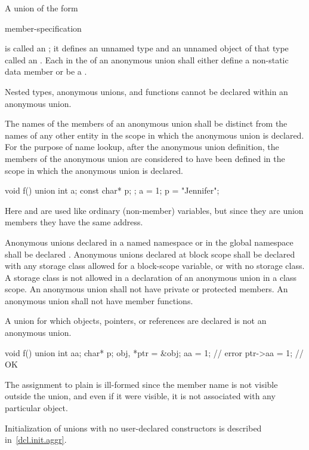 \pnum
A union of the form
\begin{ncsimplebnf}
 \terminal{\{} member-specification \terminal{\}} \terminal{;}
\end{ncsimplebnf}
is called an ; it defines an unnamed type and
an unnamed object of that type called an .
Each  in the 
of an anonymous union shall either define a non-static data member or be a
.
\begin{note}
Nested types, anonymous unions, and functions cannot be declared within an anonymous
union.
\end{note}
The names of the members of an anonymous union shall be distinct from
the names of any other entity in the scope in which the anonymous union
is declared. For the purpose of name lookup, after the anonymous union
definition, the members of the anonymous union are considered to have
been defined in the scope in which the anonymous union is declared.
%
\begin{example}
\begin{codeblock}
void f() {
  union { int a; const char* p; };
  a = 1;
  p = "Jennifer";
}
\end{codeblock}

Here  and  are used like ordinary (non-member)
variables, but since they are union members they have the same address.
\end{example}

\pnum
{}%
%
Anonymous unions declared in a named namespace or in the global
namespace shall be declared . Anonymous unions declared at
block scope shall be declared with any storage class allowed for a
block-scope variable, or with no storage class. A storage class is not
allowed in a declaration of an anonymous union in a class scope.
%
%
An anonymous union shall not have private or protected
members. An anonymous union shall not have
member functions.

\pnum
A union for which objects, pointers, or references are declared is not an anonymous union.
\begin{example}
\begin{codeblock}
void f() {
  union { int aa; char* p; } obj, *ptr = &obj;
  aa = 1;           // error
  ptr->aa = 1;      // OK
}
\end{codeblock}

The assignment to plain  is ill-formed since the member name
is not visible outside the union, and even if it were visible, it is not
associated with any particular object.
\end{example}
\begin{note}
Initialization of unions with no user-declared constructors is described
in~\ref{dcl.init.aggr}.
\end{note}

